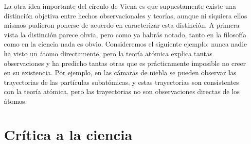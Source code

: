 La otra idea importante del círculo de Viena es que supuestamente existe una
distinción objetiva entre hechos observacionales y teorías, aunque ni siquiera
ellos mismos pudieron ponerse de acuerdo en caracterizar esta distinción.
A primera vista la distinción parece obvia, pero como ya habrás notado, tanto en
la filosofía como en la ciencia nada es obvio.
Consideremos el siguiente ejemplo: nunca nadie ha visto un átomo directamente,
pero la teoría atómica explica tantas observaciones y ha predicho tantas otras
que es prácticamente imposible no creer en su existencia.
Por ejemplo, en las cámaras de niebla se pueden observar las trayectorias de las
partículas subatómicas, y estas trayectorias son consistentes con la teoría
atómica, pero las trayectorias no son observaciones directas de los átomos.


\section{Crítica a la ciencia}
\label{sec:criticaalaciencia}
